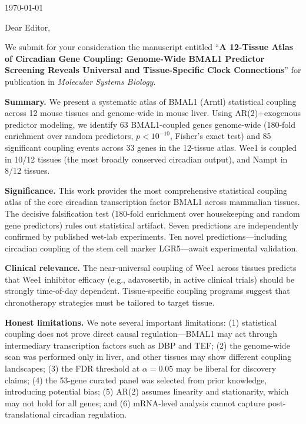 \documentclass[11pt,letterpaper]{article}
\begin{document}
\today

\vspace{1cm}

Dear Editor,

\vspace{0.5cm}

We submit for your consideration the manuscript entitled ``\textbf{A 12-Tissue Atlas of Circadian Gene Coupling: Genome-Wide BMAL1 Predictor Screening Reveals Universal and Tissue-Specific Clock Connections}'' for publication in \textit{Molecular Systems Biology}.

\vspace{0.3cm}

\textbf{Summary.} We present a systematic atlas of BMAL1 (Arntl) statistical coupling across 12 mouse tissues and genome-wide in mouse liver. Using AR(2)+exogenous predictor modeling, we identify 63 BMAL1-coupled genes genome-wide (180-fold enrichment over random predictors, $p < 10^{-10}$, Fisher's exact test) and 85 significant coupling events across 33 genes in the 12-tissue atlas. Wee1 is coupled in 10/12 tissues (the most broadly conserved circadian output), and Nampt in 8/12 tissues.

\vspace{0.3cm}

\textbf{Significance.} This work provides the most comprehensive statistical coupling atlas of the core circadian transcription factor BMAL1 across mammalian tissues. The decisive falsification test (180-fold enrichment over housekeeping and random gene predictors) rules out statistical artifact. Seven predictions are independently confirmed by published wet-lab experiments. Ten novel predictions---including circadian coupling of the stem cell marker LGR5---await experimental validation.

\vspace{0.3cm}

\textbf{Clinical relevance.} The near-universal coupling of Wee1 across tissues predicts that Wee1 inhibitor efficacy (e.g., adavosertib, in active clinical trials) should be strongly time-of-day dependent. Tissue-specific coupling programs suggest that chronotherapy strategies must be tailored to target tissue.

\vspace{0.3cm}

\textbf{Honest limitations.} We note several important limitations: (1) statistical coupling does not prove direct causal regulation---BMAL1 may act through intermediary transcription factors such as DBP and TEF; (2) the genome-wide scan was performed only in liver, and other tissues may show different coupling landscapes; (3) the FDR threshold at $\alpha = 0.05$ may be liberal for discovery claims; (4) the 53-gene curated panel was selected from prior knowledge, introducing potential bias; (5) AR(2) assumes linearity and stationarity, which may not hold for all genes; and (6) mRNA-level analysis cannot capture post-translational circadian regulation.
\end{document}
